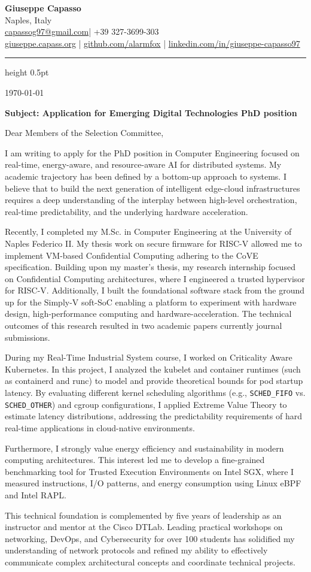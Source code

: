 \documentclass[11pt,a4paper]{article}
\makeatletter
\newcommand{\contactheader}{
    \begin{center}
        {\huge \textbf{Giuseppe Capasso}} \\
        \vspace{2mm}
        \small{
            Naples, Italy \\
            \href{mailto:capassog97@gmail.com}{capassog97@gmail.com}| +39 327-3699-303\\
            \href{https://giuseppe.capass.org}{giuseppe.capass.org} |
            \href{https://github.com/alarmfox}{github.com/alarmfox} |
            \href{https://linkedin.com/in/giuseppe-capasso97}{linkedin.com/in/giuseppe-capasso97}
        }
    \end{center}
    \vspace{2mm}
    \hrule height 0.5pt
    \vspace{8mm}
}
\makeatother
\begin{document}
\pagestyle{empty}

\contactheader
\hfill \today

\textbf{Subject: Application for Emerging Digital Technologies PhD position}

Dear Members of the Selection Committee,

I am writing to apply for the PhD position in Computer Engineering focused on real-time, energy-aware, and resource-aware AI for distributed systems. My academic trajectory has been defined by a bottom-up approach to systems. I believe that to build the next generation of intelligent edge-cloud infrastructures requires a deep understanding of the interplay between high-level orchestration, real-time predictability, and the underlying hardware acceleration.

Recently, I completed my M.Sc. in Computer Engineering at the University of Naples Federico II. My thesis work on secure firmware for RISC-V allowed me to implement VM-based Confidential Computing adhering to the CoVE specification. Building upon my master’s thesis, my research internship focused on Confidential Computing architectures, where I engineered a trusted hypervisor for RISC-V. Additionally, I built the foundational software stack from the ground up for the Simply-V soft-SoC enabling a platform to experiment with hardware design, high-performance computing and hardware-acceleration. The technical outcomes of this research resulted in two academic papers currently journal submissions.

During my Real-Time Industrial System course, I worked on Criticality Aware Kubernetes. In this project, I analyzed the kubelet and container runtimes (such as containerd and runc) to model and provide theoretical bounds for pod startup latency. By evaluating different kernel scheduling algorithms (e.g., \texttt{SCHED\_FIFO} vs. \texttt{SCHED\_OTHER}) and cgroup configurations, I applied Extreme Value Theory to estimate latency distributions, addressing the predictability requirements of hard real-time applications in cloud-native environments.

Furthermore, I strongly value energy efficiency and sustainability in modern computing architectures. This interest led me to develop a fine-grained benchmarking tool for Trusted Execution Environments on Intel SGX, where I measured instructions, I/O patterns, and energy consumption using Linux eBPF and Intel RAPL.

This technical foundation is complemented by five years of leadership as an instructor and mentor at the Cisco DTLab. Leading practical workshops on networking, DevOps, and Cybersecurity for over 100 students has solidified my understanding of network protocols and refined my ability to effectively communicate complex architectural concepts and coordinate technical projects.
\end{document}

